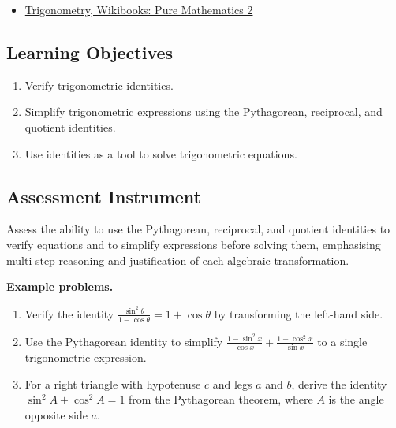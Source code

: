 \begin{itemize}
  \item \href{https://en.wikibooks.org/wiki/A-level_Mathematics/CIE/Pure_Mathematics_2/Trigonometry}{Trigonometry, Wikibooks: Pure Mathematics 2}
\end{itemize}

\subsection{Learning Objectives}
\label{ssec:lear-fe6e}

\begin{enumerate}
    \item Verify trigonometric identities.
    \item Simplify trigonometric expressions using the Pythagorean, reciprocal, and quotient identities.
    \item Use identities as a tool to solve trigonometric equations.
\end{enumerate}

\subsection{Assessment Instrument}
\label{ssec:asse-3669}

Assess the ability to use the Pythagorean, reciprocal, and quotient identities to verify
equations and to simplify expressions before solving them, emphasising multi-step
reasoning and justification of each algebraic transformation.

\textbf{Example problems.}
\begin{enumerate}
    \item Verify the identity $\frac{\sin^{2}\theta}{1 - \cos\theta} = 1 + \cos\theta$ by transforming the left-hand side.
    \item Use the Pythagorean identity to simplify $\frac{1 - \sin^{2}x}{\cos x} + \frac{1 - \cos^{2}x}{\sin x}$ to a single trigonometric expression.
    \item For a right triangle with hypotenuse $c$ and legs $a$ and $b$, derive the identity $\sin^{2}A + \cos^{2}A = 1$ from the Pythagorean theorem, where $A$ is the angle opposite side $a$.
\end{enumerate}


